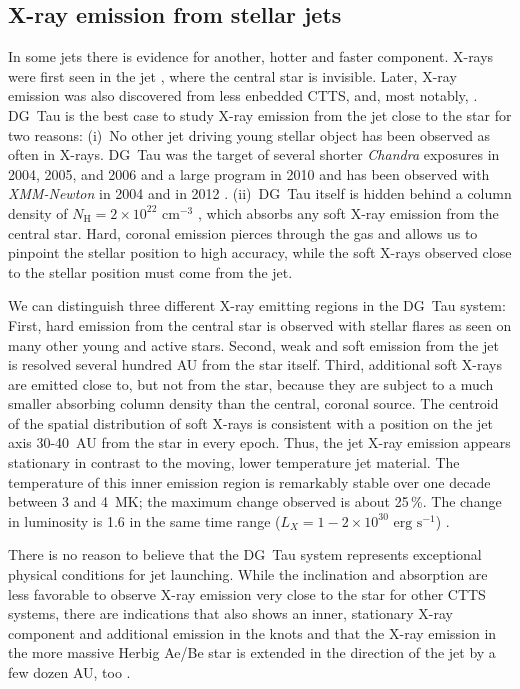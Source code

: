 \subsection{X-ray emission from stellar jets}
\label{sect:introxray}
In some jets there is evidence for another, hotter and faster component. X-rays were first seen in the jet  \citep{2001Natur.413..708P,2012A&A...542A.123S}, where the central star is invisible. Later, X-ray emission was also discovered from less enbedded CTTS,  \citep{2014ApJ...788..101S} and, most notably, . DG~Tau is the best case to study X-ray emission from the jet close to the star for two reasons: (i)~No other jet driving young stellar object has been observed as often in X-rays. DG~Tau was the target of several shorter \emph{Chandra} exposures in 2004, 2005, and 2006 and a large program in 2010 \citep{2005ApJ...626L..53G,2008A&A...478..797G,2011ASPC..448..617G} and has been observed with \emph{XMM-Newton} in 2004 \citep{2007A&A...468..353G} and in 2012 \citep{SchneiderDGTauXray}. (ii)~DG~Tau itself is hidden behind a column density of $N_{\textrm{H}}=2\times10^{22}\textrm{ cm}^{-3}$ \citep{2008A&A...478..797G}, which absorbs any soft X-ray emission from the central star. Hard, coronal emission pierces through the gas and allows us to pinpoint the stellar position to high accuracy, while the soft X-rays observed close to the stellar position must come from the jet.

We can distinguish three different X-ray emitting regions in the DG~Tau system: First, hard emission from the central star is observed with stellar flares as seen on many other young and active stars. Second, weak and soft emission from the jet is resolved several hundred AU from the star itself. Third, additional soft X-rays are emitted close to, but not from the star, because they are subject to a much smaller absorbing column density than the central, coronal source. The centroid of the spatial distribution of soft X-rays is consistent with a position on the jet axis 30-40~AU from the star \citep{2008A&A...488L..13S,2011ASPC..448..617G} in every epoch. Thus, the jet X-ray emission appears stationary in contrast to the moving, lower temperature jet material.  The temperature of this inner emission region is remarkably stable over one decade between 3 and 4~MK; the maximum change observed is about 25\,\%. The change in luminosity is 1.6 in the same time range ($L_X=1-2\times10^{30}\textrm{ erg s}^{-1}$) \citep{SchneiderDGTauXray}.

There is no reason to believe that the DG~Tau system represents exceptional physical conditions for jet launching. While the inclination and absorption are less favorable to observe X-ray emission very close to the star for other CTTS systems, there are indications that  also shows an inner, stationary X-ray component and additional emission in the knots \citep{2011A&A...530A.123S,2011ApJ...737...54B} and that the X-ray emission in the more massive Herbig Ae/Be star  is extended in the direction of the jet by a few dozen AU, too \citep{2005ApJ...628..811S,2009A&A...494.1041G,2013A&A...552A.142G}.

